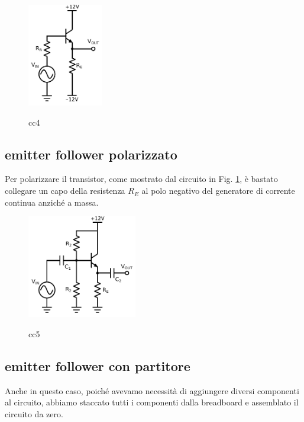 \begin{figure}
	\caption{cc4}
	\includegraphics[height=45mm]{cc4.pdf}
	\label{fig:cc4}
\end{figure}

\subsection{emitter follower polarizzato}
Per polarizzare il transistor, come mostrato dal circuito in Fig. \ref{fig:cc4}, è bastato collegare un capo della resistenza $R_E$ al polo negativo del generatore di corrente continua anziché a massa.

\begin{figure}
	\caption{cc5}
	\includegraphics[height=45mm]{cc5.pdf}
	\label{fig:cc5}
\end{figure}

\subsection{emitter follower con partitore}
Anche in questo caso, poiché avevamo necessità di aggiungere diversi componenti al circuito, abbiamo staccato tutti i componenti dalla breadboard e assemblato il circuito da zero.
